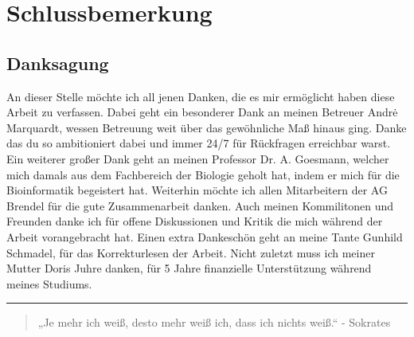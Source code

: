 \chapter{Schlussbemerkung}
\label{cha:Schluss}


\section{Danksagung}

An dieser Stelle möchte ich all jenen Danken, die es mir ermöglicht haben diese Arbeit zu verfassen. Dabei geht ein besonderer Dank an meinen Betreuer Andr\.{e} Marquardt, wessen Betreuung weit über das gewöhnliche Maß hinaus ging. Danke das du so ambitioniert dabei und immer 24/7 für Rückfragen erreichbar warst. Ein weiterer großer Dank geht an meinen Professor Dr. A. Goesmann, welcher mich damals aus dem Fachbereich der Biologie geholt hat, indem er mich für die Bioinformatik begeistert hat. Weiterhin möchte ich allen Mitarbeitern der AG Brendel für die gute Zusammenarbeit danken. Auch meinen Kommilitonen und Freunden danke ich für offene Diskussionen und Kritik die mich während der Arbeit vorangebracht hat. Einen extra Dankeschön geht an meine Tante Gunhild Schmadel, für das Korrekturlesen der Arbeit. Nicht zuletzt muss ich meiner Mutter Doris Juhre danken, für 5 Jahre finanzielle Unterstützung während meines Studiums.


\vspace*{\fill} 
\noindent\rule{\textwidth}{1pt}
\begin{quote}
    „Je mehr ich weiß, desto mehr weiß ich, dass ich nichts weiß.“
    \newline
    - Sokrates    
\end{quote}
